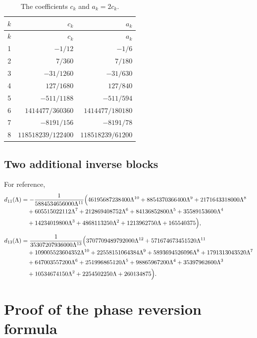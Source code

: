 \documentclass[11pt,a4paper,oneside]{book}
\begin{document}
\begin{longtable}{c r r}
\caption{The coefficients \(c_k\) and \(a_k=2c_k\).}
\label{tab:c-a}\\
\toprule
\(k\)&\(c_k\)&\(a_k\)\\
\midrule
\endfirsthead
\toprule
\(k\)&\(c_k\)&\(a_k\)\\
\midrule
\endhead
1&\(-1/12\)&\(-1/6\)\\
2&\(7/360\)&\(7/180\)\\
3&\(-31/1260\)&\(-31/630\)\\
4&\(127/1680\)&\(127/840\)\\
5&\(-511/1188\)&\(-511/594\)\\
6&\(1414477/360360\)&\(1414477/180180\)\\
7&\(-8191/156\)&\(-8191/78\)\\
8&\(118518239/122400\)&\(118518239/61200\)\\
\bottomrule
\end{longtable}

\section{Two additional inverse blocks}

For reference,
{\small
\begin{align}
 d_{11}(\Lambda)
 &=-\frac{1}{5884534656000\Lambda^{11}}
 \Bigl(
 46195687238400\Lambda^{10}
 +8854370366400\Lambda^9
 +2171643318000\Lambda^8
 \notag\\
 &\quad
 +605515022112\Lambda^7
 +212869408752\Lambda^6
 +84136852800\Lambda^5
 +35589153600\Lambda^4
 \notag\\
 &\quad
 +14234019800\Lambda^3
 +4868113250\Lambda^2
 +1213962750\Lambda
 +165540375
 \Bigr),\label{eq:d11}\\[2mm]
 d_{13}(\Lambda)
 &=\frac{1}{35307207936000\Lambda^{13}}
 \Bigl(
 3707709489792000\Lambda^{12}
 +571674673451520\Lambda^{11}
 \notag\\
 &\quad
 +109005523604352\Lambda^{10}
 +22558151064384\Lambda^9
 +5893694526096\Lambda^8
 +1791313043520\Lambda^7
 \notag\\
 &\quad
 +647003557200\Lambda^6
 +251996865120\Lambda^5
 +98865967200\Lambda^4
 +35397962600\Lambda^3
 \notag\\
 &\quad
 +10534674150\Lambda^2
 +2254502250\Lambda
 +260134875
 \Bigr).
 \label{eq:d13}
\end{align}
}

\chapter{Proof of the phase reversion formula}
\end{document}
